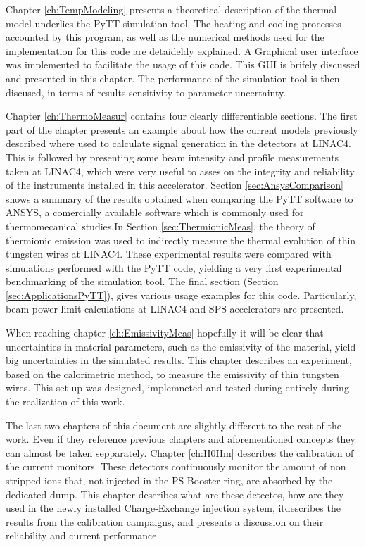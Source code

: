 Chapter \ref{ch:TempModeling} presents a theoretical description of the thermal model  underlies the PyTT simulation tool. The heating and cooling processes accounted by this program, as well as the numerical methods used for the implementation for this code are detaideldy explained. A Graphical user interface was implemented to facilitate the usage of this code. This GUI is brifely discussed and presented in this chapter. The performance of the simulation tool is then discused, in terms of results sensitivity to parameter uncertainty.

Chapter \ref{ch:ThermoMeasur} contains four clearly differentiable sections. The first part of the chapter presents an example about how the current models previously described where used to calculate signal generation in the detectors at LINAC4. This is followed by presenting some beam intensity and profile measurements taken at LINAC4, which were very useful to asses on the integrity and reliability of the instruments installed in this accelerator. Section \ref{sec:AnsysComparison} shows a summary of the results obtained when comparing the PyTT software to ANSYS, a comercially available software which is commonly used for thermomecanical studies.In Section \ref{sec:ThermionicMeas}, the theory of thermionic emission was used to indirectly measure the thermal evolution of thin tungsten wires at LINAC4. These experimental results were compared with simulations performed with the PyTT code, yielding a very first experimental benchmarking of the simulation tool. The final section (Section \ref{sec:ApplicationsPyTT}), gives various usage examples for this code. Particularly, beam power limit calculations at LINAC4 and SPS accelerators are presented. 

When reaching chapter \ref{ch:EmissivityMeas} hopefully it will be clear that uncertainties in material parameters, such as the emissivity of the material, yield big uncertainties in the simulated results. This chapter describes an experiment, based on the calorimetric method, to measure the emissivity of thin tungsten wires. This set-up was designed, implemneted and tested during entirely during the realization of this work. 

The last two chapters of this document are slightly different to the rest of the work. Even if they reference previous chapters and aforementioned concepts they can almost be taken sepparately. Chapter \ref{ch:H0Hm} describes the calibration of the \hzhm current monitors. These detectors  continuously monitor the amount of non stripped \hm ions that, not injected in the PS Booster ring, are absorbed by the dedicated dump. This chapter describes what are these detectos, how are they used in the newly installed Charge-Exchange injection system, itdescribes the results from the calibration campaigns, and presents a discussion on their reliability and current performance. 


